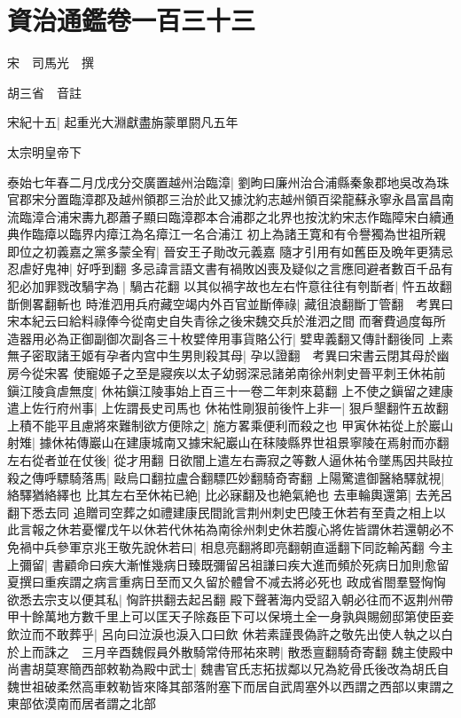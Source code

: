 \section{資治通鑑卷一百三十三}
宋　司馬光　撰

胡三省　音註

宋紀十五|{
	起重光大淵獻盡旃蒙單閼凡五年}


太宗明皇帝下

泰始七年春二月戊戌分交廣置越州治臨漳|{
	劉昫曰廉州治合浦縣秦象郡地吳改為珠官郡宋分置臨漳郡及越州領郡三治於此又據沈約志越州領百梁龍蘇永寧永昌富昌南流臨漳合浦宋夀九郡蕭子顯曰臨漳郡本合浦郡之北界也按沈約宋志作臨障宋白續通典作臨瘴以臨界内瘴江為名瘴江一名合浦江}
初上為諸王寛和有令譽獨為世祖所親即位之初義嘉之黨多蒙全宥|{
	晉安王子勛改元義嘉}
隨才引用有如舊臣及晩年更猜忌忍虐好鬼神|{
	好呼到翻}
多忌諱言語文書有禍敗凶喪及疑似之言應囘避者數百千品有犯必加罪戮改騧字為|{
	騧古花翻}
以其似禍字故也左右忤意往往有刳斮者|{
	忤五故翻斮側畧翻斬也}
時淮泗用兵府藏空竭内外百官並斷俸祿|{
	藏徂浪翻斷丁管翻　考異曰宋本紀云曰給料祿俸今從南史自失青徐之後宋魏交兵於淮泗之間}
而奢費過度每所造器用必為正御副御次副各三十枚嬖倖用事貨賂公行|{
	嬖卑義翻又傳計翻後同}
上素無子密取諸王姬有孕者内宫中生男則殺其母|{
	孕以證翻　考異曰宋書云閉其母於幽房今從宋畧}
使寵姬子之至是寢疾以太子幼弱深忌諸弟南徐州刺史晉平刺王休祐前鎭江陵貪虐無度|{
	休祐鎭江陵事始上百三十一卷二年刺來葛翻}
上不使之鎭留之建康遣上佐行府州事|{
	上佐謂長史司馬也}
休祐性剛狠前後忤上非一|{
	狠戶墾翻忤五故翻}
上積不能平且慮將來難制欲方便除之|{
	施方畧乘便利而殺之也}
甲寅休祐從上於巖山射雉|{
	據休祐傳巖山在建康城南又據宋紀巖山在秣陵縣界世祖景寧陵在焉射而亦翻}
左右從者並在仗後|{
	從才用翻}
日欲闇上遣左右壽寂之等數人逼休祐令墜馬因共敺拉殺之傳呼驃騎落馬|{
	敺烏口翻拉盧合翻驃匹妙翻騎奇寄翻}
上陽驚遣御醫絡驛就視|{
	絡驛猶絡繹也}
比其左右至休祐已絶|{
	比必寐翻及也絶氣絶也}
去車輪輿還第|{
	去羌呂翻下悉去同}
追贈司空葬之如禮建康民間訛言荆州刺史巴陵王休若有至貴之相上以此言報之休若憂懼戊午以休若代休祐為南徐州刺史休若腹心將佐皆謂休若還朝必不免禍中兵參軍京兆王敬先說休若曰|{
	相息亮翻將即亮翻朝直遥翻下同訖輸芮翻}
今主上彌留|{
	書顧命曰疾大漸惟幾病日臻既彌留呂祖謙曰疾大進而頻於死病日加則愈留夏撰曰重疾謂之病言重病日至而又久留於體曾不减去將必死也}
政成省閤羣豎恟恟欲悉去宗支以便其私|{
	恟許拱翻去起呂翻}
殿下聲著海内受詔入朝必往而不返荆州帶甲十餘萬地方數千里上可以匡天子除姦臣下可以保境土全一身孰與賜劒邸第使臣妾飲泣而不敢葬乎|{
	呂向曰泣淚也淚入口曰飲}
休若素謹畏偽許之敬先出使人執之以白於上而誅之　三月辛酉魏假員外散騎常侍邢祐來聘|{
	散悉亶翻騎奇寄翻}
魏主使殿中尚書胡莫寒簡西部敕勒為殿中武士|{
	魏書官氏志拓拔鄰以兄為紇骨氏後改為胡氏自魏世祖破柔然高車敕勒皆來降其部落附塞下而居自武周塞外以西謂之西部以東謂之東部依漠南而居者謂之北部}
